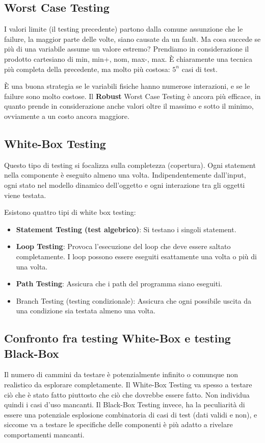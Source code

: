         \subsection{Worst Case Testing}
            I valori limite (il testing precedente) partono dalla comune assunzione che le failure, la maggior parte delle volte, siano causate da un fault. Ma cosa succede se più di una variabile assume un valore estremo? Prendiamo in considerazione il prodotto cartesiano di {min, min+, nom, max-, max}. È chiaramente una tecnica più completa della precedente, ma molto più costosa: $5^n$ casi di test.
            
            È una buona strategia se le variabili fisiche hanno numerose interazioni, e se le failure sono molto costose. Il \textbf{Robust} Worst Case Testing è ancora più efficace, in quanto prende in considerazione anche valori oltre il massimo e sotto il minimo, ovviamente a un costo ancora maggiore.
            
        \subsection{White-Box Testing}
            Questo tipo di testing si focalizza sulla completezza (copertura). Ogni statement nella componente è eseguito almeno una volta. Indipendentemente dall'input, ogni stato nel modello dinamico dell'oggetto e ogni interazione tra gli oggetti viene testata.
        
            Esistono quattro tipi di white box testing:
            \begin{itemize}
                \item \textbf{Statement Testing (test algebrico)}: Si testano i singoli statement.
                \item \textbf{Loop Testing}: Provoca l'esecuzione del loop che deve essere saltato completamente. I loop possono essere eseguiti esattamente una volta o più di una volta.
                \item \textbf{Path Testing}: Assicura che i path del programma siano eseguiti.
                \item Branch Testing (testing condizionale): Assicura che ogni possibile uscita da una condizione sia testata almeno una volta.
            \end{itemize}
            
        \subsection{Confronto fra testing White-Box e testing Black-Box}
            Il numero di cammini da testare è potenzialmente infinito o comunque non realistico da esplorare completamente. Il White-Box Testing va spesso a testare ciò che è stato fatto piuttosto che ciò che dovrebbe essere fatto. Non individua quindi i casi d'uso mancanti. Il Black-Box Testing invece, ha la peculiarità di essere una potenziale esplosione combinatoria di casi di test (dati validi e non), e siccome va a testare le specifiche delle componenti è più adatto a rivelare comportamenti mancanti.
            
